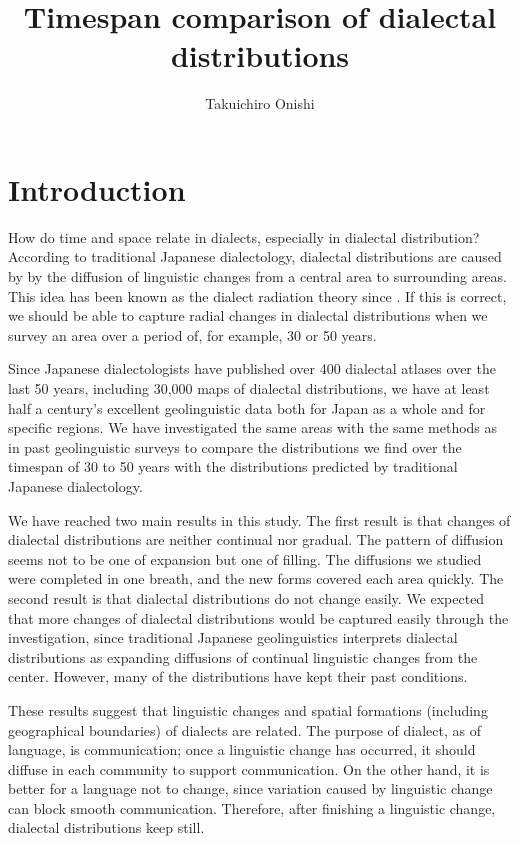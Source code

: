 \documentclass[output=paper]{LSP/langsci}
\author{Takuichiro Onishi\affiliation{National Institute for Japanese Language and Linguistics}}
\title{Timespan comparison of dialectal distributions}
\begin{document}
 
 
% 
% 
 
\section{Introduction}

How do time and space relate in dialects, especially in dialectal distribution? According to traditional Japanese dialectology, dialectal distributions are caused by by the diffusion of linguistic changes from a central area to surrounding areas. This idea has been known as the dialect radiation theory since \citet{yanagita_kagyuukoo._1930}. If this is correct, we should be able to capture radial changes in dialectal distributions when we survey an area over a period of, for example, 30 or 50 years.

Since Japanese dialectologists have published over 400 dialectal atlases over the last 50 years, including 30,000 maps of dialectal distributions, we have at least half a century’s excellent geolinguistic data both for Japan as a whole and for specific regions. We have investigated the same areas with the same methods as in past geolinguistic surveys to compare the distributions we find over the timespan of 30 to 50 years with the distributions predicted by traditional Japanese dialectology.

We have reached two main results in this study. The first result is that changes of dialectal distributions are neither continual nor gradual. The pattern of diffusion seems not to be one of expansion but one of filling. The diffusions we studied were completed in one breath, and the new forms covered each area quickly. The second result is that dialectal distributions do not change easily. We expected that more changes of dialectal distributions would be captured easily through the investigation, since traditional Japanese geolinguistics interprets dialectal distributions as expanding diffusions of continual linguistic changes from the center. However, many of the distributions have kept their past conditions.

These results suggest that linguistic changes and spatial formations (including geographical boundaries) of dialects are related. The purpose of dialect, as of language, is communication; once a linguistic change has occurred, it should diffuse in each community to support communication. On the other hand, it is better for a language not to change, since variation caused by linguistic change can block smooth communication. Therefore, after finishing a linguistic change, dialectal distributions keep still.
\end{document}
